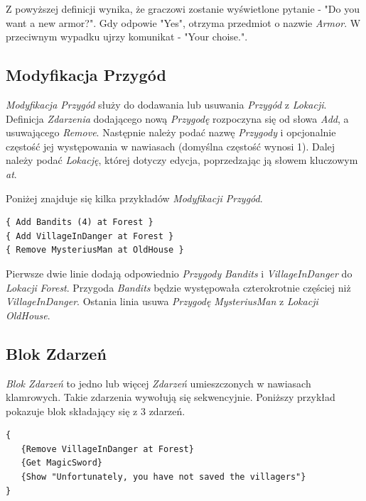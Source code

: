 \documentclass[openright]{xmgr}
\begin{document}
Z powyższej definicji wynika, że graczowi zostanie wyświetlone pytanie - "Do you want a new armor?". Gdy odpowie "Yes", otrzyma przedmiot o nazwie \textit{Armor}. W przeciwnym wypadku ujrzy komunikat - "Your choise.".

\subsection*{Modyfikacja Przygód}
\textit{Modyfikacja Przygód} służy do dodawania lub usuwania \textit{Przygód} z \textit{Lokacji}. Definicja \textit{Zdarzenia} dodającego nową \textit{Przygodę} rozpoczyna się od słowa \textit{Add}, a usuwającego \textit{Remove}. Następnie należy podać nazwę \textit{Przygody} i opcjonalnie częstość jej występowania w nawiasach (domyślna częstość wynosi 1). Dalej należy podać \textit{Lokację}, której dotyczy edycja, poprzedzając ją słowem kluczowym \textit{at}.

Poniżej znajduje się kilka przykładów \textit{Modyfikacji Przygód}. 
\begin{verbatim}
{ Add Bandits (4) at Forest }
{ Add VillageInDanger at Forest }
{ Remove MysteriusMan at OldHouse }
\end{verbatim}
Pierwsze dwie linie dodają odpowiednio \textit{Przygody} \textit{Bandits} i \textit{VillageInDanger} do \textit{Lokacji} \textit{Forest}. Przygoda \textit{Bandits} będzie występowała czterokrotnie częściej niż \textit{VillageInDanger}. Ostania linia usuwa \textit{Przygodę} \textit{MysteriusMan} z \textit{Lokacji} \textit{OldHouse}.

\subsection*{Blok Zdarzeń}
\textit{Blok Zdarzeń } to jedno lub więcej \textit{Zdarzeń} umieszczonych w nawiasach klamrowych. Takie zdarzenia wywołują się sekwencyjnie.
Poniższy przykład pokazuje blok składający się z 3 zdarzeń.
\begin{verbatim}
{
   {Remove VillageInDanger at Forest}
   {Get MagicSword}
   {Show "Unfortunately, you have not saved the villagers"}
}
\end{verbatim}
\end{document}
